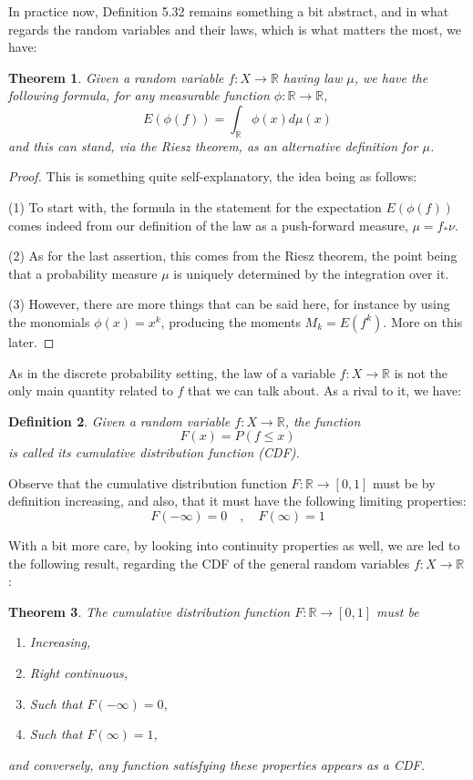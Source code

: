 \documentclass[12pt]{amsbook}
\newtheorem{theorem}{Theorem}[chapter]
\newtheorem{definition}[theorem]{Definition}
\begin{document}
In practice now, Definition 5.32 remains something a bit abstract, and in what regards the random variables and their laws, which is what matters the most, we have:

\begin{theorem}
Given a random variable $f:X\to\mathbb R$ having law $\mu$, we have the following formula, for any measurable function $\phi:\mathbb R\to\mathbb R$,
$$E(\phi(f))=\int_\mathbb R\phi(x)d\mu(x)$$
and this can stand, via the Riesz theorem, as an alternative definition for $\mu$.
\end{theorem}

\begin{proof}
This is something quite self-explanatory, the idea being as follows:

\medskip

(1) To start with, the formula in the statement for the expectation $E(\phi(f))$ comes indeed from our definition of the law as a push-forward measure, $\mu=f_*\nu$.

\medskip

(2) As for the last assertion, this comes from the Riesz theorem, the point being that a probability measure $\mu$ is uniquely determined by the integration over it. 

\medskip

(3) However, there are more things that can be said here, for instance by using the monomials $\phi(x)=x^k$, producing the moments $M_k=E(f^k)$. More on this later.
\end{proof}

As in the discrete probability setting, the law of a variable $f:X\to\mathbb R$ is not the only main quantity related to $f$ that we can talk about. As a rival to it, we have:

\begin{definition}
Given a random variable $f:X\to\mathbb R$, the function
$$F(x)=P(f\leq x)$$
is called its cumulative distribution function (CDF).
\end{definition}

Observe that the cumulative distribution function $F:\mathbb R\to[0,1]$ must be by definition increasing, and also, that it must have the following limiting properties:
$$F(-\infty)=0\quad,\quad F(\infty)=1$$

With a bit more care, by looking into continuity properties as well, we are led to the following result, regarding the CDF of the general random variables $f:X\to\mathbb R$:

\begin{theorem}
The cumulative distribution function $F:\mathbb R\to[0,1]$ must be
\begin{enumerate}
\item Increasing,

\item Right continuous,

\item Such that $F(-\infty)=0$,

\item Such that $F(\infty)=1$,
\end{enumerate}
and conversely, any function satisfying these properties appears as a CDF.
\end{theorem}
\end{document}
